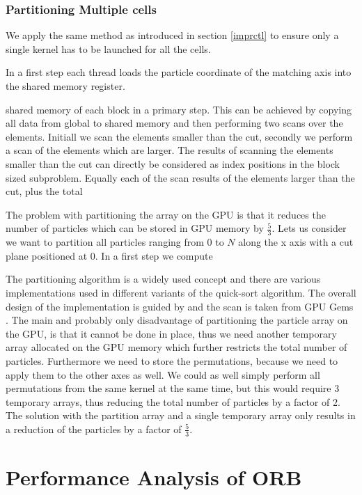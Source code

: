 \documentclass[]{article}
\begin{document}
\subsubsection{Partitioning Multiple cells}

We apply the same method as introduced in section \ref{imprctl} to ensure only a single kernel has to be launched for all the cells. 

In a first step each thread loads the particle coordinate of the matching axis into the shared memory register. 

shared memory of each block in a primary step. This can be achieved by copying all data from global to shared memory and then performing two scans over the elements. 
Initiall we scan the elements smaller than the cut, secondly we perform a scan of the elements which are larger. The results of scanning the elements smaller than the cut can directly be considered as index positions in the block sized subproblem. Equally each of the scan results of the elements larger than the cut, plus the total 

The problem with partitioning the array on the GPU is that it reduces the number of particles which can be stored in GPU memory by $\frac{5}{3}$. Lets us consider we want to partition all particles ranging from 0 to $N$ along the x axis with a cut plane positioned at 0. In a first step we compute 	

The partitioning algorithm is a widely used concept and there are various implementations used in different variants of the quick-sort algorithm. The overall design of the implementation is guided by  and the scan is taken from GPU Gems . The main and probably only disadvantage of partitioning the particle array on the GPU, is that it cannot be done in place, thus we need another temporary array allocated on the GPU memory which further restricts the total number of particles. Furthermore we need to store the permutations, because we need to apply them to the other axes as well. We could as well simply perform all permutations from the same kernel at the same time, but this would require 3 temporary arrays, thus reducing the total number of particles by a factor of 2. The solution with the partition array and a single temporary array only results in a reduction of the particles by a factor of $\frac{5}{3}$. 	



\newpage
\section{Performance Analysis of ORB}\label{sec:empan}
\end{document}
